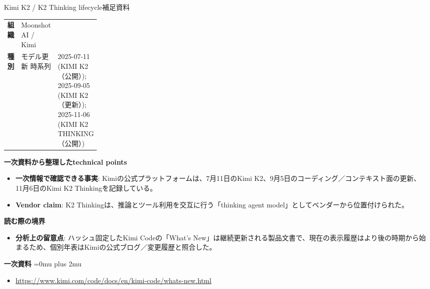 \begin{technicalnote}{Kimi K2 / K2 Thinking lifecycle}{補足資料}
\begingroup
\begin{tabularx}{\linewidth}{@{}>{\bfseries}p{0.22\linewidth}X@{}}
組織 & Moonshot AI / Kimi \\
種別 & モデル更新
時系列 & 2025-07-11 (KIMI K2（公開）); 2025-09-05 (KIMI K2（更新）); 2025-11-06 (KIMI K2 THINKING（公開）) \\
\end{tabularx}
\smallskip
{\bfseries 一次資料から整理したtechnical points}
\begin{itemize}[leftmargin=1.5em,itemsep=0.35em]
\item \textbf{一次情報で確認できる事実}: Kimiの公式プラットフォームは、7月11日のKimi K2、9月5日のコーディング／コンテキスト面の更新、11月6日のKimi K2 Thinkingを記録している。
\item \textbf{Vendor claim}: K2 Thinkingは、推論とツール利用を交互に行う「thinking agent model」としてベンダーから位置付けられた。
\end{itemize}
\begin{minipage}{\linewidth}
{\bfseries 読む際の境界}
\begin{itemize}[leftmargin=1.5em,itemsep=0.35em]
\item \textbf{分析上の留意点}: ハッシュ固定したKimi Codeの「What's New」は継続更新される製品文書で、現在の表示履歴はより後の時期から始まるため、個別年表はKimiの公式ブログ／変更履歴と照合した。
\end{itemize}
\begin{samepage}
{\bfseries 一次資料}
\begingroup\sloppy
\Urlmuskip=0mu plus 2mu\relax
\begin{itemize}[leftmargin=1.5em,itemsep=0.25em]
\item {\scriptsize\url{https://www.kimi.com/code/docs/en/kimi-code/whats-new.html}}
\end{itemize}
\endgroup
\end{samepage}
\end{minipage}
\endgroup
\end{technicalnote}
\medskip

